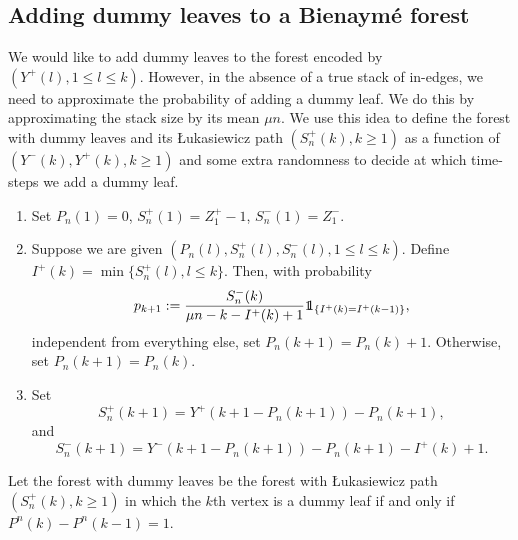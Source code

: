 \subsection{Adding dummy leaves to a Bienaymé forest}\label{subsec.purpleleavesGWforest}
We would like to add dummy leaves to the forest encoded by $(Y^+(l),1\leq l \leq k)$. However, in the absence of a true stack of in-edges, we need to approximate the probability of adding a dummy leaf. We do this by approximating the stack size by its mean $\mu n$. 
We use this idea to define the forest with dummy leaves and its \L ukasiewicz path $(S_n^{+}(k), k\geq 1)$ as a function of $(Y^-(k), Y^+(k) ,k\geq 1)$ and some extra randomness to decide at which time-steps we add a dummy leaf.
\begin{enumerate} 
    \item Set $P_n(1)=0$, $S_n^{+}(1)=Z_1^+-1$, $S_n^{-}(1)=Z_1^-$. 
    \item Suppose we are given $(P_n(l),S_n^{+}(l),S_n^{-}(l), 1\leq l \leq k)$. Define 
    $I^{+}(k)=\min\{S_n^{+}(l), l\leq k\}$. Then, with probability $$p_{k+1}:=\frac{S_n^{-}(k)}{\mu n - k -I^{+}(k)+1}\one_{\{I^{+}(k)=I^{+}(k-1)\}},$$ independent from everything else, set $P_n(k+1)=P_n(k)+1$. Otherwise, set $P_n(k+1)=P_n(k)$. 
    \item Set $$S_n^{+}(k+1)=Y^+(k+1-P_n(k+1))-P_n(k+1),$$ and $$S_n^{-}(k+1)=Y^-(k+1-P_n(k+1))-P_n(k+1)-I^{+}(k)+1.$$
\end{enumerate}
Let the forest with dummy leaves be the forest with \L ukasiewicz path $(S_n^{+}(k), k\geq 1)$ in which the $k$th vertex is a dummy leaf if and only if $P^n(k)-P^n(k-1)=1$. 
